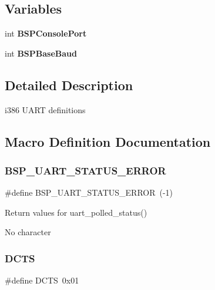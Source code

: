 \subsection*{Variables}
\begin{DoxyCompactItemize}
\item 
\mbox{\label{group__i386__uart_gab10b7d0ac9fedd8be199f159d7ed4fb9}} 
int {\bfseries B\+S\+P\+Console\+Port}
\item 
\mbox{\label{group__i386__uart_ga08d7d79d76b888b7f031e080f66bf06b}} 
int {\bfseries B\+S\+P\+Base\+Baud}
\end{DoxyCompactItemize}


\subsection{Detailed Description}
i386 U\+A\+RT definitions 



\subsection{Macro Definition Documentation}
\mbox{\label{group__i386__uart_ga57197a9e8404913bbbde4a23a78cbcff}} 
\subsubsection{\texorpdfstring{BSP\_UART\_STATUS\_ERROR}{BSP\_UART\_STATUS\_ERROR}}
{\footnotesize\ttfamily \#define B\+S\+P\+\_\+\+U\+A\+R\+T\+\_\+\+S\+T\+A\+T\+U\+S\+\_\+\+E\+R\+R\+OR~(-\/1)}



Return values for uart\+\_\+polled\+\_\+status() 

No character \mbox{\label{group__i386__uart_ga230decb2e8e20d6ef3df26c7051f775e}} 
\subsubsection{\texorpdfstring{DCTS}{DCTS}}
{\footnotesize\ttfamily \#define D\+C\+TS~0x01}



